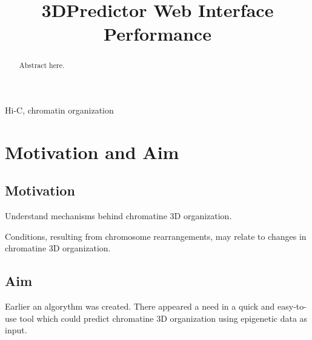 \documentclass[conference]{IEEEtran}
\begin{document}
\title{3DPredictor Web Interface Performance}

\author{
\and
{}
\and
{}
}

\maketitle

\begin{abstract}
Abstract here.
\end{abstract}

\begin{IEEEkeywords}
Hi-C, chromatin organization
\end{IEEEkeywords}

\section{Motivation and Aim}

\subsection{Motivation}

Understand mechanisms behind chromatine 3D organization.

Conditions, resulting from chromosome rearrangements, may relate to changes in chromatine 3D organization.


\subsection{Aim}

Earlier an algorythm was created.
There appeared a need in a quick and easy-to-use tool which could predict chromatine 3D organization using epigenetic data as input.
\end{document}
